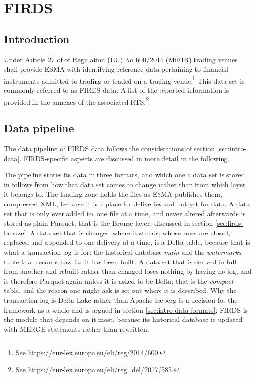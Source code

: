 
\chapter{FIRDS}\label{ch:firds}

\section{Introduction}

Under Article 27 of of Regulation (EU) No 600/2014 (MiFIR) trading venues shall provide ESMA with identifying reference data pertaining to financial instruments admitted to trading or traded on a trading venue.\footnote{See \url{https://eur-lex.europa.eu/eli/reg/2014/600}.} This data set is commonly referred to as FIRDS data. A list of the reported information is provided in the annexes of the associated RTS.\footnote{See \url{https://eur-lex.europa.eu/eli/reg_del/2017/585}.}


\section{Data pipeline}

The data pipeline of FIRDS data follows the considerations of section \ref{sec:intro-data}. FIRDS-specific aspects are discussed in more detail in the following.

The pipeline stores its data in three formats, and which one a data set is stored in follows from how that data set comes to change rather than from which layer it belongs to. The landing zone holds the files as ESMA publishes them, compressed XML, because it is a place for deliveries and not yet for data. A data set that is only ever added to, one file at a time, and never altered afterwards is stored as plain Parquet; that is the Bronze layer, discussed in section \ref{sec:firds-bronze}. A data set that is changed where it stands, whose rows are closed, replaced and appended to one delivery at a time, is a Delta table, because that is what a transaction log is for: the historical database \emph{main} and the \emph{watermarks} table that records how far it has been built. A data set that is derived in full from another and rebuilt rather than changed loses nothing by having no log, and is therefore Parquet again unless it is asked to be Delta; that is the \emph{compact} table, and the reason one might ask is set out where it is described. Why the transaction log is Delta Lake rather than Apache Iceberg is a decision for the framework as a whole and is argued in section \ref{sec:intro-data-formats}; FIRDS is the module that depends on it most, because its historical database is updated with MERGE statements rather than rewritten.


